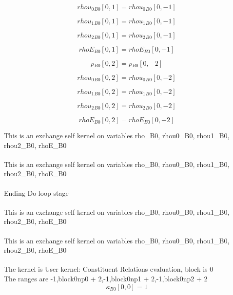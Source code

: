 \documentclass{article}
\begin{document}
\begin{dmath}{rhou_{0}{_{B0}}}[{0,1}] = {rhou_{0}{_{B0}}}[{0,-1}]\end{dmath}

\begin{dmath}{rhou_{1}{_{B0}}}[{0,1}] = {rhou_{1}{_{B0}}}[{0,-1}]\end{dmath}

\begin{dmath}{rhou_{2}{_{B0}}}[{0,1}] = {rhou_{2}{_{B0}}}[{0,-1}]\end{dmath}

\begin{dmath}{rhoE{_{B0}}}[{0,1}] = {rhoE{_{B0}}}[{0,-1}]\end{dmath}

\begin{dmath}{\rho{_{B0}}}[{0,2}] = {\rho{_{B0}}}[{0,-2}]\end{dmath}

\begin{dmath}{rhou_{0}{_{B0}}}[{0,2}] = {rhou_{0}{_{B0}}}[{0,-2}]\end{dmath}

\begin{dmath}{rhou_{1}{_{B0}}}[{0,2}] = {rhou_{1}{_{B0}}}[{0,-2}]\end{dmath}

\begin{dmath}{rhou_{2}{_{B0}}}[{0,2}] = {rhou_{2}{_{B0}}}[{0,-2}]\end{dmath}

\begin{dmath}{rhoE{_{B0}}}[{0,2}] = {rhoE{_{B0}}}[{0,-2}]\end{dmath}

\noindent This is an exchange self kernel on variables rho_B0, rhou0_B0, rhou1_B0, rhou2_B0, rhoE_B0\\\\\noindent This is an exchange self kernel on variables rho_B0, rhou0_B0, rhou1_B0, rhou2_B0, rhoE_B0\\\\\noindent Ending Do loop stage\\
\\\noindent This is an exchange self kernel on variables rho_B0, rhou0_B0, rhou1_B0, rhou2_B0, rhoE_B0\\\\\noindent This is an exchange self kernel on variables rho_B0, rhou0_B0, rhou1_B0, rhou2_B0, rhoE_B0\\\\\noindent The kernel is User kernel: Constituent Relations evaluation, block is 0\\\noindent The ranges are -1,block0np0 + 2,-1,block0np1 + 2,-1,block0np2 + 2\\\begin{dmath}{\kappa{_{B0}}}[{0,0}] = 1\end{dmath}
\end{document}
